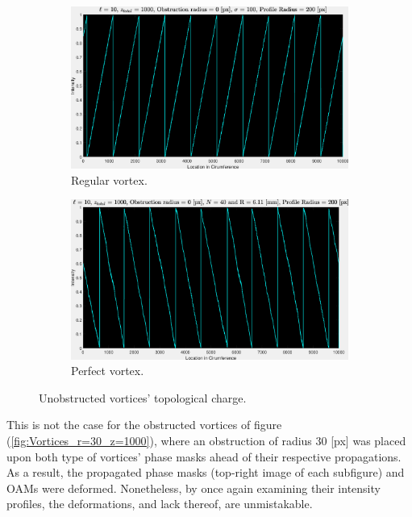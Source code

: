 \begin{figure}[htbp]
    \centering
    \begin{subfigure}[b]{0.45\textwidth}
        \centering
        \includegraphics[width=\textwidth]{images/c04/type=0_r=0_zi=0_zf=1000_TC.eps}
        \caption{Regular vortex.}
    \end{subfigure}
    \hfill
    \begin{subfigure}[b]{0.45\textwidth}
        \centering
        \includegraphics[width=\textwidth]{images/c04/type=1_r=0_zi=0_zf=1000_TC.eps}
        \caption{Perfect vortex.}
    \end{subfigure}
    \caption{Unobstructed vortices' topological charge.}
    \label{fig:Vortices_r=0_z=1000_TC}
\end{figure}

This is not the case for the obstructed vortices of figure (\ref{fig:Vortices_r=30_z=1000}), where an obstruction of radius 30 [px] was placed upon both type of vortices' phase masks ahead of their respective propagations. As a result, the propagated phase masks (top-right image of each subfigure) and OAMs were deformed. Nonetheless, by once again examining their intensity profiles, the deformations, and lack thereof, are unmistakable. 


